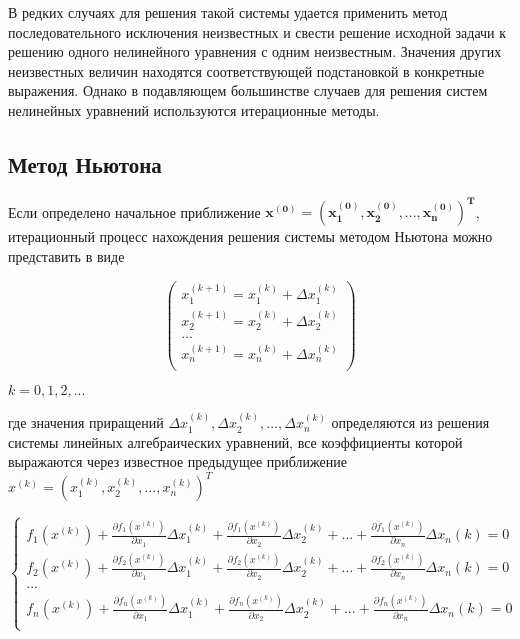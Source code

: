 В редких случаях для решения такой системы удается применить метод
последовательного исключения неизвестных и свести решение исходной задачи к
решению одного нелинейного уравнения с одним неизвестным. Значения других
неизвестных величин находятся соответствующей подстановкой в конкретные выражения.
Однако в подавляющем большинстве случаев для решения систем нелинейных уравнений
используются итерационные методы.

\subsection*{Метод Ньютона}

Если определено начальное приближение $\mathbf{x^{(0)} = (x_1^{(0)}, x_2^{(0)}, ..., x_n^{(0)})^T}$,
итерационный процесс нахождения решения системы методом Ньютона можно
представить в виде

\begin{equation}\label{eq:pythagoras}
\begin{pmatrix}
    x_1^{(k+1)} = x_1^{(k)} + \Delta x_1^{(k)} \\
    x_2^{(k+1)} = x_2^{(k)} + \Delta x_2^{(k)} \\
    ... \\
    x_n^{(k+1)} = x_n^{(k)} + \Delta x_n^{(k)} \\
\end{pmatrix}
\end{equation}

$k = 0, 1, 2, ...$

где значения приращений $\Delta x_1^{(k)}, \Delta x_2^{(k)}, ..., \Delta x_n^{(k)}$ определяются из решения системы
линейных алгебраических уравнений, все коэффициенты которой выражаются через
известное предыдущее приближение $x^{(k)} = (x_1^{(k)}, x_2^{(k)}, ..., x_n^{(k)})^T$

\begin{equation}\label{eq:pythagoras}
\begin{cases}
    f_1(x^{(k)}) + \frac{\partial f_1(x^{(k)})}{\partial x_1} \Delta x_1^{(k)} + \frac{\partial f_1(x^{(k)})}{\partial x_2} \Delta x_2^{(k)}
    + ... + \frac{\partial f_1(x^{(k)})}{\partial x_n} \Delta x_n{(k)} = 0 \\
    f_2(x^{(k)}) + \frac{\partial f_2(x^{(k)})}{\partial x_1} \Delta x_1^{(k)} + \frac{\partial f_2(x^{(k)})}{\partial x_2} \Delta x_2^{(k)}
    + ... + \frac{\partial f_2(x^{(k)})}{\partial x_n} \Delta x_n{(k)} = 0 \\
    ... \\
    f_n(x^{(k)}) + \frac{\partial f_n(x^{(k)})}{\partial x_1} \Delta x_1^{(k)} + \frac{\partial f_n(x^{(k)})}{\partial x_2} \Delta x_2^{(k)}
    + ... + \frac{\partial f_n(x^{(k)})}{\partial x_n} \Delta x_n{(k)} = 0 \\
\end{cases}
\end{equation}

